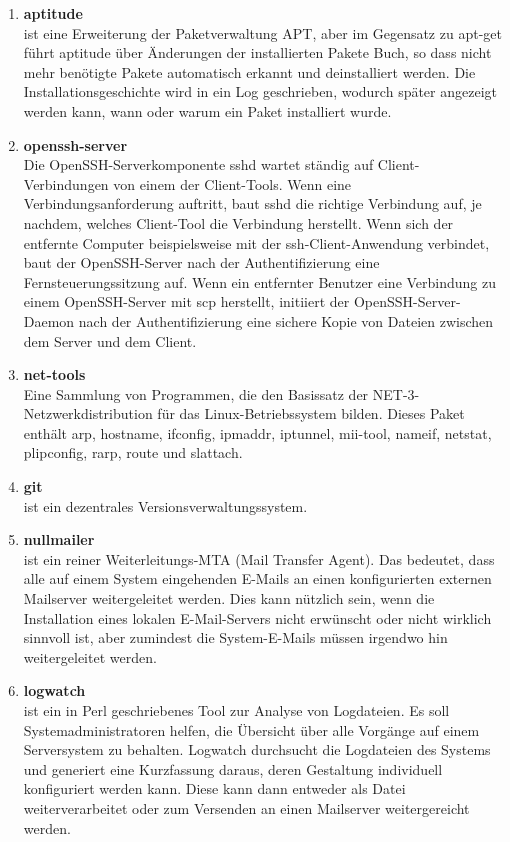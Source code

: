 \begin{enumerate}[label=\textbf{\arabic*.}]
	\item \textbf{aptitude} \\ist eine Erweiterung der Paketverwaltung APT, aber im Gegensatz zu apt-get führt aptitude über Änderungen der installierten Pakete  Buch, so dass nicht mehr benötigte Pakete automatisch erkannt und deinstalliert werden. Die Installationsgeschichte wird in ein Log geschrieben, wodurch später angezeigt werden kann, wann oder warum ein Paket installiert wurde.
	\item \textbf{openssh-server} \\Die OpenSSH-Serverkomponente sshd wartet ständig auf Client-Verbindungen von einem der Client-Tools. Wenn eine Verbindungsanforderung auftritt, baut sshd die richtige Verbindung auf, je nachdem, welches Client-Tool die Verbindung herstellt. Wenn sich der entfernte Computer beispielsweise mit der ssh-Client-Anwendung verbindet, baut der OpenSSH-Server nach der Authentifizierung eine Fernsteuerungssitzung auf. Wenn ein entfernter Benutzer eine Verbindung zu einem OpenSSH-Server mit scp herstellt, initiiert der OpenSSH-Server-Daemon nach der Authentifizierung eine sichere Kopie von Dateien zwischen dem Server und dem Client.
	\item \textbf{net-tools}\\Eine Sammlung von Programmen, die den Basissatz der NET-3-Netzwerkdistribution für das Linux-Betriebssystem bilden. Dieses Paket enthält arp, hostname, ifconfig, ipmaddr, iptunnel, mii-tool, nameif, netstat, plipconfig, rarp, route und slattach.
	\item \textbf{git} \\ist ein dezentrales Versionsverwaltungssystem.
	\item \textbf{nullmailer}\\ist ein reiner Weiterleitungs-MTA (Mail Transfer Agent). Das bedeutet, dass alle auf einem System eingehenden E-Mails an einen konfigurierten externen Mailserver weitergeleitet werden. Dies kann nützlich sein, wenn die Installation eines lokalen E-Mail-Servers nicht erwünscht oder nicht wirklich sinnvoll ist, aber zumindest die System-E-Mails müssen irgendwo hin weitergeleitet werden.
	\item \textbf{logwatch} \\ist ein in Perl geschriebenes Tool zur Analyse von Logdateien. Es soll Systemadministratoren helfen, die Übersicht über alle Vorgänge auf einem Serversystem zu behalten. Logwatch durchsucht die Logdateien des Systems und generiert eine Kurzfassung daraus, deren Gestaltung individuell konfiguriert werden kann. Diese kann dann entweder als Datei weiterverarbeitet oder zum Versenden an einen Mailserver weitergereicht werden.
\end{enumerate}\pagestyle{scrheadings}

